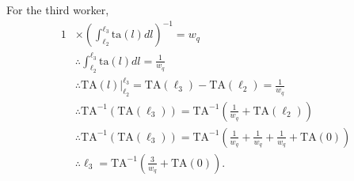 \documentclass[hidelinks, nonatbib]{elsarticle}
\begin{document}
\begin{enumerate}
For the third worker,
\begin{align}
    1 
    &\times 
    \left(
        \int_{\ell_2}^{\ell_3}
        \text{ta}(l)
        dl
    \right) ^ {-1}
    =
    w_q
    \\
    &\therefore
    \int_{\ell_2}^{\ell_3}
    \text{ta}(l)
    dl
    =
    \frac{1}{w_q}
    \\
    &\therefore
    \text{TA}(l)
    \big|_{\ell_2}^{\ell_3}
    =
    \text{TA}(\ell_3)
    -
    \text{TA}(\ell_2)
    =
    \frac{1}{w_q}
    \\
    &\therefore
    \text{TA}^{-1}(
        \text{TA}(\ell_3)
    )
    =
    \text{TA}^{-1}\left(
        \frac{1}{w_q}
        +
        \text{TA}(\ell_2)
    \right)
    \\
    &\therefore
    \text{TA}^{-1}(
        \text{TA}(\ell_3)
    )
    =
    \text{TA}^{-1}\left(
        \frac{1}{w_q}
        +
        \frac{1}{w_q}
        +
        \frac{1}{w_q}
        +
        \text{TA}(0)
    \right)
    \\
    &\therefore
    \ell_3
    =
    \text{TA}^{-1}\left(
        \frac{3}{w_q}
        +
        \text{TA}(0)
    \right)
    .
\end{align}


\end{enumerate}
\end{document}
